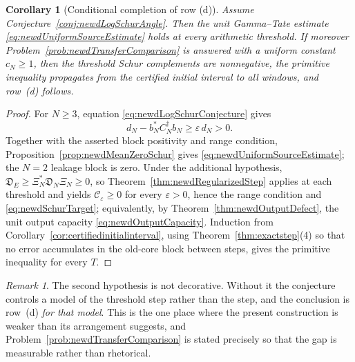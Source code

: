 \documentclass[11pt]{amsart}
\newtheorem{corollary}[theorem]{Corollary}
\theoremstyle{definition}
\theoremstyle{remark}
\newtheorem{remark}[theorem]{Remark}
\begin{document}
\begin{corollary}[Conditional completion of row (d)]
\label{cor:newdConditionalRowD}
Assume Conjecture~\ref{conj:newdLogSchurAngle}.  Then the unit Gamma--Tate
estimate \eqref{eq:newdUniformSourceEstimate} holds at every arithmetic
threshold.  If moreover Problem~\ref{prob:newdTransferComparison} is answered
with a uniform constant $c_N\geq1$, then the threshold Schur complements are
nonnegative, the primitive inequality propagates from the certified initial
interval to all windows, and row~(d) follows.
\end{corollary}

\begin{proof}
For $N\geq3$, equation \eqref{eq:newdLogSchurConjecture} gives
\[
 d_N-b_N^*C_N^\dagger b_N
 \geq \varepsilon\,d_N>0 .
\]
Together with the asserted block positivity and range condition,
Proposition~\ref{prop:newdMeanZeroSchur} gives
\eqref{eq:newdUniformSourceEstimate}; the $N=2$ leakage block is zero.  Under
the additional hypothesis, $\mathfrak D_E\geq\Xi_N^*\mathfrak D_N\Xi_N\geq0$,
so Theorem~\ref{thm:newdRegularizedStep} applies at each threshold and yields
$\mathcal C_\varepsilon\geq0$ for every $\varepsilon>0$, hence the range
condition and \eqref{eq:newdSchurTarget}; equivalently, by
Theorem~\ref{thm:newdOutputDefect}, the unit output capacity
\eqref{eq:newdOutputCapacity}.  Induction from
Corollary~\ref{cor:certifiedinitialinterval}, using
Theorem~\ref{thm:exactstep}(4) so that no error accumulates in the old-core
block between steps, gives the primitive inequality for every $T$.
\end{proof}

\begin{remark}
The second hypothesis is not decorative.  Without it the conjecture controls
a model of the threshold step rather than the step, and the conclusion is
row~(d) \emph{for that model}.  This is the one place where the present
construction is weaker than its arrangement suggests, and
Problem~\ref{prob:newdTransferComparison} is stated precisely so that the gap
is measurable rather than rhetorical.
\end{remark}
\end{document}
